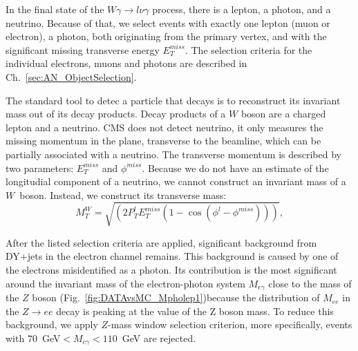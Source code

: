 In the final state of the $W\gamma\rightarrow l\nu\gamma$ process, there is a lepton, a photon, and a neutrino. Because of that, we select events with exactly one lepton (muon or electron), a photon, both originating from the primary vertex, and with the significant missing transverse energy $E_T^{miss}$. The selection criteria for the individual electrons, muons and photons are described in Ch.~\ref{sec:AN_ObjectSelection}.

The standard tool to detec a particle that decays is to reconstruct its invariant mass out of its decay products. Decay products of a $W$ boson are a charged lepton and a neutrino. CMS does not detect neutrino, it only measures the missing momentum in the plane, transverse to the beamline, which can be partially associated with a neutrino. The transverse momentum is described by two parameters: $E_T^{miss}$ and $\phi^{miss}$. Because we do not have an estimate of the longitudial component of a neutrino, we cannot construct an invariant mass of a $W$~boson. Instead, we construct its transverse mass:
\begin{equation}
M_T^W=\sqrt{(2  P_T^{l}  E_T^{miss}  (1-\cos{(\phi^{l}-\phi^{miss})}))},
\end{equation}

After the listed selection criteria are applied, significant background from DY+jets in the electron channel remains. This background is caused by one of the electrons misidentified as a photon. Its contribution is the most significant around the invariant mass of the electron-photon system $M_{e\gamma}$ close to the mass of the $Z$ boson (Fig.~\ref{fig:DATAvsMC_Mpholep1})because the distribution of $M_{ee}$ in the $Z\rightarrow e e$ decay is peaking at the value of the Z boson mass. To reduce this background, we apply $Z$-mass window selection criterion, more specifically, events with $70$~GeV$<M_{e\gamma}<110$~GeV are rejected. 

